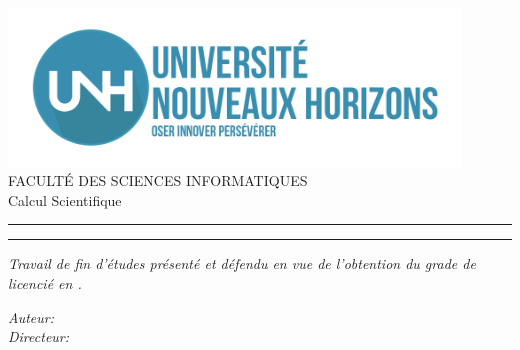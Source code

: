 
\begin{titlepage}

\begin{center}
\large

\vspace*{.03\textheight}


 

\includegraphics[width=12cm]{images/logo_unh} \\[0.75cm]

{\LARGE{{\textsc{FACULT\'E DES SCIENCES INFORMATIQUES}}} }\\[0.2cm]

{\LARGE{{{Calcul Scientifique}}} }\\
\medskip %

\vspace{2.5cm} 

\begin{center}
	\rule{0.9\textwidth}{.2pt}
\end{center}
\vspace{0.2cm}
{\LARGE \bfseries {\myTitle}}%
\begin{center}
	\rule{0.9\textwidth}{.2pt}
\end{center}


\textit{Travail de fin d’études présenté  et défendu en vue de l’obtention du grade de licencié en \myDepartment.}\\[2cm]

\begin{minipage}[t]{0.4\textwidth}
	\begin{flushleft} \large
	\end{flushleft}
\end{minipage}
\begin{minipage}[t]{0.5\textwidth}
	\begin{flushright} \large
		\emph{Auteur:}
		\textbf{{\myName}}\\
		\emph{Directeur:} 
		\textbf{{\myProf}}  
	\end{flushright}
\end{minipage}\\[3cm]


\end{center}
\end{titlepage}
